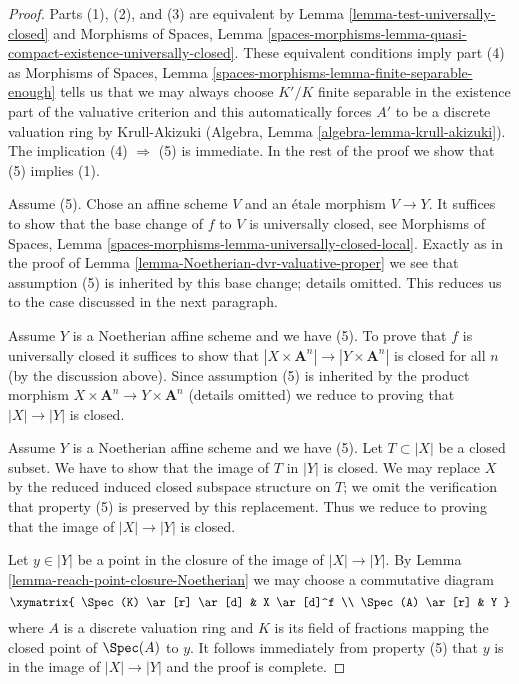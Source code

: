 \begin{proof}
Parts (1), (2), and (3) are equivalent by
Lemma \ref{lemma-test-universally-closed} and
Morphisms of Spaces, Lemma
\ref{spaces-morphisms-lemma-quasi-compact-existence-universally-closed}.
These equivalent conditions imply part (4) as
Morphisms of Spaces, Lemma \ref{spaces-morphisms-lemma-finite-separable-enough}
tells us that we may always choose $K'/K$ finite separable in
the existence part of the valuative criterion and this
automatically forces $A'$ to be a discrete valuation ring by Krull-Akizuki
(Algebra, Lemma \ref{algebra-lemma-krull-akizuki}).
The implication (4) $\Rightarrow$ (5) is immediate.
In the rest of the proof we show that (5) implies (1).

\medskip\noindent
Assume (5). Chose an affine scheme $V$ and an \'etale morphism $V \to Y$.
It suffices to show that the base change of $f$ to $V$ is universally closed,
see Morphisms of Spaces, Lemma
\ref{spaces-morphisms-lemma-universally-closed-local}.
Exactly as in the proof of Lemma \ref{lemma-Noetherian-dvr-valuative-proper}
we see that assumption (5) is inherited by this base change; details
omitted. This reduces us to the case discussed in the next paragraph.

\medskip\noindent
Assume $Y$ is a Noetherian affine scheme and we have (5).
To prove that $f$ is universally closed it suffices to show that
$|X \times \mathbf{A}^n| \to |Y \times \mathbf{A}^n|$ is closed
for all $n$ (by the discussion above). Since assumption (5)
is inherited by the product morphism
$X \times \mathbf{A}^n \to Y \times \mathbf{A}^n$ (details omitted)
we reduce to proving that $|X| \to |Y|$ is closed.

\medskip\noindent
Assume $Y$ is a Noetherian affine scheme and we have (5).
Let $T \subset |X|$ be a closed subset. We have to show that
the image of $T$ in $|Y|$ is closed. We may replace $X$
by the reduced induced closed subspace structure on $T$; we
omit the verification that property (5) is preserved by
this replacement. Thus we reduce to proving that the image
of $|X| \to |Y|$ is closed.

\medskip\noindent
Let $y \in |Y|$ be a point in the closure of the image of
$|X| \to |Y|$. By Lemma \ref{lemma-reach-point-closure-Noetherian}
we may choose a commutative diagram
$$
\xymatrix{
\Spec(K) \ar[r] \ar[d] & X \ar[d]^f \\
\Spec(A) \ar[r] & Y
}
$$
where $A$ is a discrete valuation ring and $K$ is its field of fractions
mapping the closed point of $\Spec(A)$ to $y$. It follows immediately
from property (5) that $y$ is in the image of
$|X| \to |Y|$ and the proof is complete.
\end{proof}


















